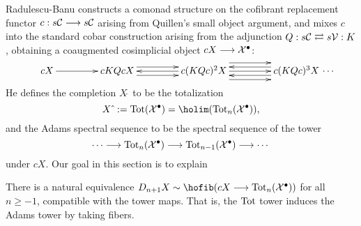 \documentclass[11pt]{amsart}
\theoremstyle{plain}
\begin{document}
Radulescu-Banu constructs a comonad structure on the cofibrant replacement functor $c:s\mathcal{C}\longrightarrow s\mathcal{C}$ arising from Quillen's small object argument, and mixes $c$ into the standard cobar construction arising from the adjunction $Q:s\mathcal{C}\rightleftarrows s\mathcal{V}:K$, obtaining a coaugmented cosimplicial object $cX\longrightarrow\mathcal{X}^\bullet$:
\[
\vcenter{
\def\labelstyle{\scriptstyle}
\xymatrix@C=1.5cm@1{
cX\,
\ar[r]
&
\,cKQcX\,
\ar[r];[]
&
\,c(KQc)^2X\,
\ar@<-1ex>[l];[]
\ar@<+1ex>[l];[]
\ar@<+1ex>[r];[]
\ar@<-1ex>[r];[]
&
\,c(KQc)^3X\,\makebox[0cm][l]{\,$\cdots $}
\ar[l];[]
\ar@<-2ex>[l];[]
\ar@<+2ex>[l];[]
}}\]
He defines the completion $X\hat{\ }$ to be the totalization
\[X\hat{\ }:=\textup{Tot}(\calX^\bullet)=\holim (\textup{Tot}_n(\calX^\bullet)),\]
and the Adams spectral sequence to be the spectral sequence of the tower
\[\cdots \longrightarrow\textup{Tot}_n(\mathcal{X}^\bullet)\longrightarrow \textup{Tot}_{n-1}(\mathcal{X}^\bullet)\longrightarrow\cdots \]
under $cX$. Our goal in this section is to explain
\begin{prop}\label{towerIdentification}
There is a natural equivalence  $D_{n+1}X\sim\hofib(cX\to\textup{Tot}_{n}(\calX^\bullet))$ for all $n\geq-1$, compatible with the tower maps. That is, the $\textup{Tot}$ tower induces the Adams tower by taking fibers.
\end{prop}
\end{document}

